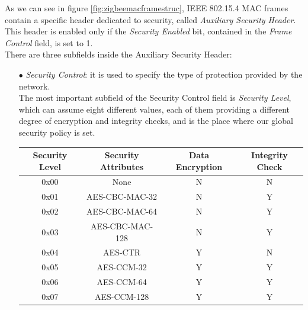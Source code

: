 \documentclass[12pt]{report}
\begin{document}
{As we can see in figure \ref{fig:zigbeemacframestruc}, IEEE 802.15.4 MAC frames contain a specific header dedicated to security, called \emph{Auxiliary Security Header}.\\
This header is enabled only if the \emph{Security Enabled} bit, contained in the \emph{Frame Control} field, is set to 1.\\
There are three subfields inside the Auxiliary Security Header:

\begin{itemize}
\setlength{\itemindent}{+4mm}
\item[$\bullet$] \emph{Security Control}: it is used to specify the type of protection provided by the network.\\
The most important subfield of the Security Control field is \emph{Security Level}, which can assume eight different values, each of them providing a different degree of encryption and integrity checks, and is the place where our global security policy is set.

\begin{center}
\small
   \begin{tabular}{ | c | c | c | c |}
    \hline
    Security Level & Security Attributes & Data Encryption & Integrity Check \\ \hline
    0x00 & None & N & N \\ \hline
    0x01 & AES-CBC-MAC-32 & N & Y\\ \hline
    0x02 & AES-CBC-MAC-64 & N & Y \\ \hline
    0x03 & AES-CBC-MAC-128 & N & Y\\ \hline
    0x04 & AES-CTR & Y & N\\ \hline
    0x05 & AES-CCM-32 & Y & Y\\ \hline
    0x06 & AES-CCM-64 & Y & Y\\ \hline
    0x07 & AES-CCM-128 & Y &Y\\ \hline
    \end{tabular}
\end{center}

\end{itemize}}
\end{document}
